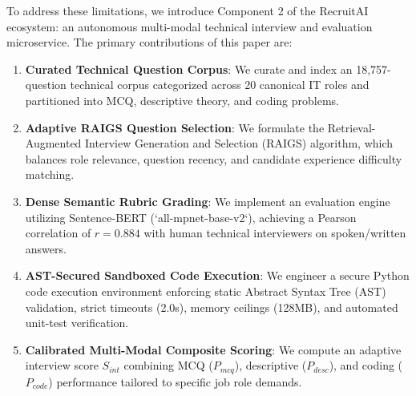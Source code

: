 \documentclass[conference]{IEEEtran}
\begin{document}
To address these limitations, we introduce Component 2 of the RecruitAI ecosystem: an autonomous multi-modal technical interview and evaluation microservice. The primary contributions of this paper are:
\begin{enumerate}
    \item \textbf{Curated Technical Question Corpus}: We curate and index an 18,757-question technical corpus categorized across 20 canonical IT roles and partitioned into MCQ, descriptive theory, and coding problems.
    \item \textbf{Adaptive RAIGS Question Selection}: We formulate the Retrieval-Augmented Interview Generation and Selection (RAIGS) algorithm, which balances role relevance, question recency, and candidate experience difficulty matching.
    \item \textbf{Dense Semantic Rubric Grading}: We implement an evaluation engine utilizing Sentence-BERT (`all-mpnet-base-v2`), achieving a Pearson correlation of $r = 0.884$ with human technical interviewers on spoken/written answers.
    \item \textbf{AST-Secured Sandboxed Code Execution}: We engineer a secure Python code execution environment enforcing static Abstract Syntax Tree (AST) validation, strict timeouts (2.0s), memory ceilings (128MB), and automated unit-test verification.
    \item \textbf{Calibrated Multi-Modal Composite Scoring}: We compute an adaptive interview score $S_{int}$ combining MCQ ($P_{mcq}$), descriptive ($P_{desc}$), and coding ($P_{code}$) performance tailored to specific job role demands.
\end{enumerate}
\end{document}
